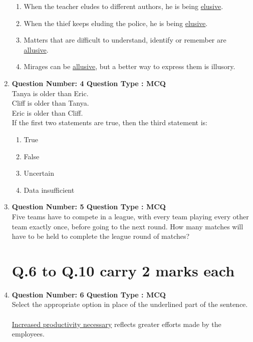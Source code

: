 \documentclass[journal,,12pt,onecolumn]{IEEEtran}
\theoremstyle{remark}
\begin{document}
\begin{enumerate}
\begin{enumerate}
    \item When the teacher eludes to different authors, he is being \underline{elusive}.
    \item When the thief keeps eluding the police, he is being \underline{elusive}.
    \item Matters that are difficult to understand, identify or remember are \underline{allusive}.
    \item Mirages can be \underline{allusive}, but a better way to express them is illusory.
\end{enumerate}
\bigskip
\item \textbf{Question Number: 4 Question Type : MCQ}\\
Tanya is older than Eric. \\
Cliff is older than Tanya. \\
Eric is older than Cliff. \\

 \setlength\parindent{24pt} If the first two statements are true, then the third statement is: \\

\begin{enumerate}
    \item True
    \item False
    \item Uncertain
    \item Data insufficient
\end{enumerate}
\bigskip
\item \textbf{Question Number: 5 Question Type : MCQ}\\
Five teams have to compete in a league, with every team playing every other team exactly once, before going to the next round. How many matches will have to be held to complete the league round of matches? \\

\begin{enumerate}
\end{enumerate}
\bigskip
\section*{Q.6 to Q.10 carry 2 marks each}
\item \textbf{Question Number: 6 Question Type : MCQ}\\
Select the appropriate option in place of the underlined part of the sentence. \\
\\
\underline{Increased productivity necessary} reflects greater efforts made by the employees. \\


\end{enumerate}
\end{document}
